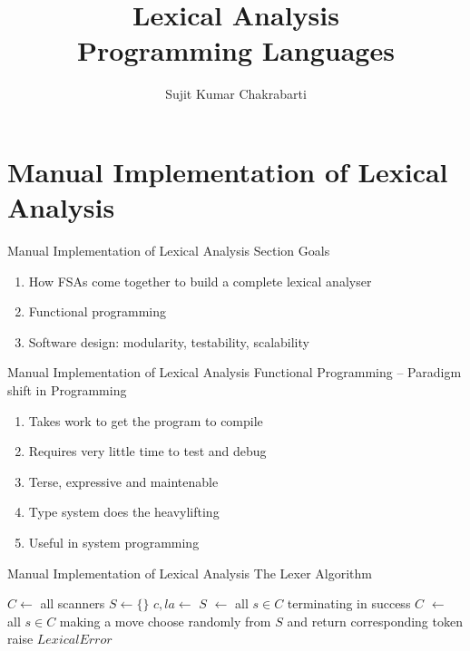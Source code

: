 \documentclass{beamer}
\title[Sujit]{Lexical Analysis \\
Programming Languages}
\author{Sujit Kumar Chakrabarti}
\institute{IIITB}
\date{}
\begin{document}
\maketitle

\section{Manual Implementation of Lexical Analysis}

\begin{frame}{Manual Implementation of Lexical Analysis}
{Section Goals}
\begin{enumerate}
	\item How FSAs come together to build a complete lexical analyser
	\item Functional programming
	\item Software design: modularity, testability, scalability
\end{enumerate}
\end{frame}


\begin{frame}{Manual Implementation of Lexical Analysis}
{Functional Programming -- Paradigm shift in Programming}
\begin{enumerate}
	\item Takes work to get the program to compile
	\item Requires very little time to test and debug
	\item Terse, expressive and maintenable
	\item Type system does the heavylifting
	\item Useful in system programming
\end{enumerate}
\end{frame}


\begin{frame}{Manual Implementation of Lexical Analysis}
{The Lexer Algorithm}
\begin{tiny}
\begin{algorithmic}[0]
  \State $C \gets$ all scanners
  \State $S \gets \{\}$
    \State $c, la \gets$ 
	\State $S$ $\gets$ all $s \in C$ terminating in success
	\State $C$ $\gets$ all $s \in C$ making a move
			\State choose randomly from $S$ and return corresponding token
		\Else
			\State raise $LexicalError$
		\EndIf
	\EndIf
  \EndWhile
\EndProcedure
\end{algorithmic}
\end{tiny}

\end{frame}
\end{document}

